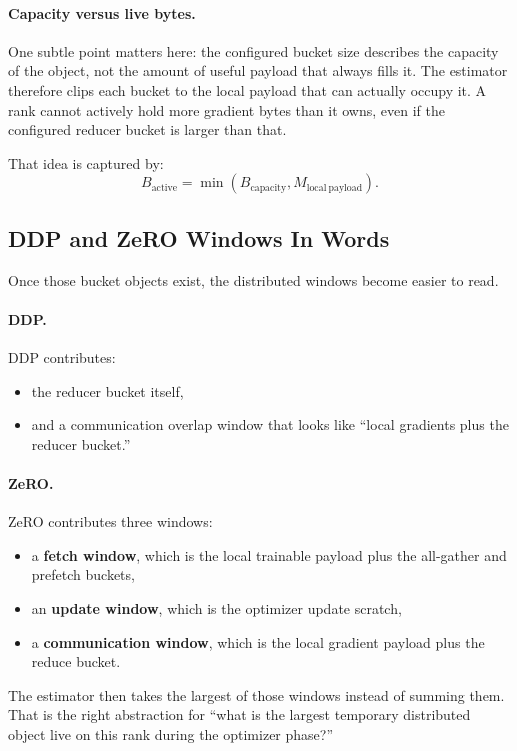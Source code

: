 \paragraph{Capacity versus live bytes.}
One subtle point matters here: the configured bucket size describes the
capacity of the object, not the amount of useful payload that always fills it.
The estimator therefore clips each bucket to the local payload that can
actually occupy it. A rank cannot actively hold more gradient bytes than it
owns, even if the configured reducer bucket is larger than that.

That idea is captured by:
\[
B_{\mathrm{active}} = \min(B_{\mathrm{capacity}}, M_{\mathrm{local\ payload}}).
\]

\subsection{DDP and ZeRO Windows In Words}
Once those bucket objects exist, the distributed windows become easier to read.

\paragraph{DDP.}
DDP contributes:
\begin{itemize}[leftmargin=1.5em]
\item the reducer bucket itself,
\item and a communication overlap window that looks like ``local gradients plus
the reducer bucket.''
\end{itemize}

\paragraph{ZeRO.}
ZeRO contributes three windows:
\begin{itemize}[leftmargin=1.5em]
\item a \textbf{fetch window}, which is the local trainable payload plus the
all-gather and prefetch buckets,
\item an \textbf{update window}, which is the optimizer update scratch,
\item a \textbf{communication window}, which is the local gradient payload plus
the reduce bucket.
\end{itemize}

The estimator then takes the largest of those windows instead of summing them.
That is the right abstraction for ``what is the largest temporary distributed
object live on this rank during the optimizer phase?''

